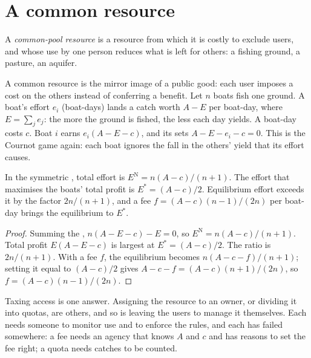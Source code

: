 \section{A common resource}\label{sec:b2:static-games:commons}

\begin{definition}\label{def:b2:static-games:common-pool}
A \emph{common-pool resource} is a resource from which it is costly to exclude
users, and whose use by one person reduces what is left for others: a fishing ground, a pasture, an aquifer.
\end{definition}

A common resource is the mirror image of a public good: each user imposes a cost on the others instead of
conferring a benefit. Let $n$ boats fish one ground. A boat's effort $e_i$ (boat-days) lands a catch worth $A - E$
per boat-day, where $E = \sum_j e_j$: the more the ground is fished, the less each day yields. A boat-day costs $c$.
Boat $i$ earns $e_i(A - E - c)$, and its  sets $A - E - e_i - c = 0$. This is the Cournot game again:
each boat ignores the fall in the others' yield that its effort causes.

\begin{proposition}\label{prop:b2:static-games:commons}
In the symmetric , total effort is $E^{\mathrm{N}} = n(A - c)/(n + 1)$. The effort that maximises the
boats' total profit is $E^{*} = (A - c)/2$. Equilibrium effort exceeds it by the factor $2n/(n + 1)$, and a fee $f =
(A - c)(n - 1)/(2n)$ per boat-day brings the equilibrium to $E^*$.
\end{proposition}

\begin{proof}
Summing the , $n(A - E - c) - E = 0$, so $E^{\mathrm{N}} = n(A - c)/(n + 1)$. Total profit $E(A - E - c)$ is
largest at $E^* = (A - c)/2$. The ratio is $2n/(n + 1)$. With a fee $f$, the equilibrium becomes $n(A - c - f)/(n + 1)$;
setting it equal to $(A - c)/2$ gives $A - c - f = (A - c)(n + 1)/(2n)$, so $f = (A - c)(n - 1)/(2n)$.
\end{proof}

Taxing access is one answer. Assigning the resource to an owner, or dividing it into quotas, are others,
and so is leaving the users to manage it themselves. Each needs someone to monitor use and to enforce the
rules, and each has failed somewhere: a fee needs an agency that knows $A$ and $c$ and has reasons to set the
fee right; a quota needs catches to be counted.

